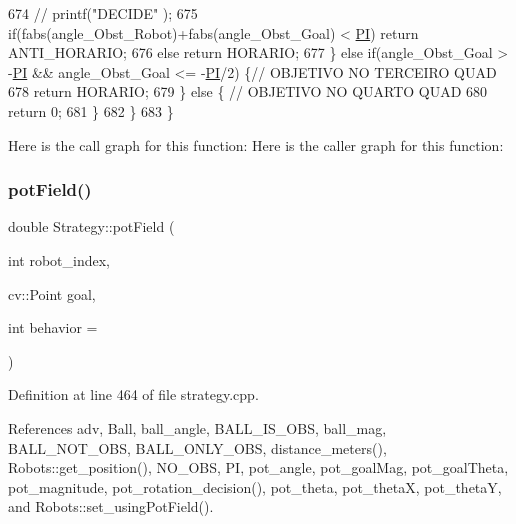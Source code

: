 \begin{DoxyCode}
674         \textcolor{comment}{//  printf("DECIDE" );}
675             \textcolor{keywordflow}{if}(fabs(angle\_Obst\_Robot)+fabs(angle\_Obst\_Goal) < \hyperlink{strategy_8cpp_a598a3330b3c21701223ee0ca14316eca}{PI}) \textcolor{keywordflow}{return} ANTI\_HORARIO;
676             \textcolor{keywordflow}{else} \textcolor{keywordflow}{return} HORARIO;
677         \} \textcolor{keywordflow}{else} \textcolor{keywordflow}{if}(angle\_Obst\_Goal > -\hyperlink{strategy_8cpp_a598a3330b3c21701223ee0ca14316eca}{PI} && angle\_Obst\_Goal <= -\hyperlink{strategy_8cpp_a598a3330b3c21701223ee0ca14316eca}{PI}/2) \{\textcolor{comment}{// OBJETIVO NO TERCEIRO QUAD}
678             \textcolor{keywordflow}{return} HORARIO;
679         \} \textcolor{keywordflow}{else} \{ \textcolor{comment}{// OBJETIVO NO QUARTO QUAD}
680             \textcolor{keywordflow}{return} 0;
681         \}
682     \}
683 \}
\end{DoxyCode}
Here is the call graph for this function\+:
Here is the caller graph for this function\+:
\mbox{\label{class_strategy_ac26f11116f795185176383122f9f088c}} 
\subsubsection{\texorpdfstring{pot\+Field()}{potField()}}
{\footnotesize\ttfamily double Strategy\+::pot\+Field (\begin{DoxyParamCaption}\item[{int}]{robot\+\_\+index,  }\item[{cv\+::\+Point}]{goal,  }\item[{int}]{behavior = {} }\end{DoxyParamCaption})}



Definition at line 464 of file strategy.\+cpp.



References adv, Ball, ball\+\_\+angle, B\+A\+L\+L\+\_\+\+I\+S\+\_\+\+O\+BS, ball\+\_\+mag, B\+A\+L\+L\+\_\+\+N\+O\+T\+\_\+\+O\+BS, B\+A\+L\+L\+\_\+\+O\+N\+L\+Y\+\_\+\+O\+BS, distance\+\_\+meters(), Robots\+::get\+\_\+position(), N\+O\+\_\+\+O\+BS, PI, pot\+\_\+angle, pot\+\_\+goal\+Mag, pot\+\_\+goal\+Theta, pot\+\_\+magnitude, pot\+\_\+rotation\+\_\+decision(), pot\+\_\+theta, pot\+\_\+thetaX, pot\+\_\+thetaY, and Robots\+::set\+\_\+using\+Pot\+Field().



